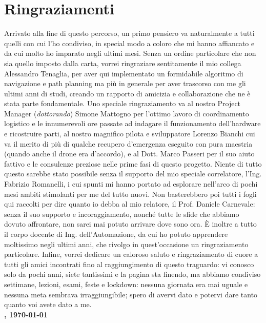 
\fancyhf{}
\thispagestyle{plain}

\chapter{Ringraziamenti}
\fontsize{12}{12}\selectfont
\onehalfspacing
Arrivato alla fine di questo percorso, un primo pensiero va naturalmente a tutti quelli con cui l'ho condiviso, in special modo a coloro che mi hanno affiancato e da cui molto ho imparato negli ultimi mesi. Senza un ordine particolare che non sia quello imposto dalla carta, vorrei ringraziare sentitamente il mio collega Alessandro Tenaglia, per aver qui implementato un formidabile algoritmo di navigazione e path planning ma più in generale per aver trascorso con me gli ultimi anni di studi, creando un rapporto di amicizia e collaborazione che ne è stata parte fondamentale. Uno speciale ringraziamento va al nostro Project Manager (\emph{dottorando}) Simone Mattogno per l'ottimo lavoro di coordinamento logistico e le innumerevoli ore passate ad indagare il funzionamento dell'hardware e ricostruire parti, al nostro magnifico pilota e sviluppatore Lorenzo Bianchi cui va il merito di più di qualche recupero d'emergenza eseguito con pura maestria (quando anche il drone era d'accordo), e al Dott. Marco Passeri per il suo aiuto fattivo e le consulenze preziose nelle prime fasi di questo progetto. Niente di tutto questo sarebbe stato possibile senza il supporto del mio speciale correlatore, l'Ing. Fabrizio Romanelli, i cui spunti mi hanno portato ad esplorare nell'arco di pochi mesi ambiti stimolanti per me del tutto nuovi. Non basterebbero poi tutti i fogli qui raccolti per dire quanto io debba al mio relatore, il Prof. Daniele Carnevale: senza il suo supporto e incoraggiamento, nonché tutte le sfide che abbiamo dovuto affrontare, non sarei mai potuto arrivare dove sono ora. È inoltre a tutto il corpo docente di Ing. dell'Automazione, da cui ho potuto apprendere moltissimo negli ultimi anni, che rivolgo in quest'occasione un ringraziamento particolare. Infine, vorrei dedicare un caloroso saluto e ringraziamento di cuore a tutti gli amici incontrati fino al raggiungimento di questo traguardo: vi conosco solo da pochi anni, siete tantissimi e la pagina sta finendo, ma abbiamo condiviso settimane, lezioni, esami, feste e lockdown: nessuna giornata era mai uguale e nessuna meta sembrava irraggiungibile; spero di avervi dato e potervi dare tanto quanto voi avete dato a me.\\
\hspace*{\fill}\textbf{\autore, \today}
